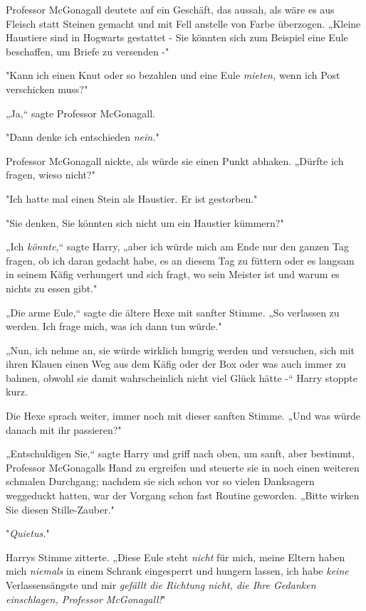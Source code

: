 {Professor McGonagall deutete auf ein Geschäft, das aussah, als wäre es aus Fleisch statt Steinen gemacht und mit Fell anstelle von Farbe überzogen. „Kleine Haustiere sind in Hogwarts gestattet - Sie könnten sich zum Beispiel eine Eule beschaffen, um Briefe zu versenden -"

"Kann ich einen Knut oder so bezahlen und eine Eule \emph{mieten,} wenn ich Post verschicken muss?"

„Ja,“ sagte Professor McGonagall.

"Dann denke ich entschieden \emph{nein.}"

Professor McGonagall nickte, als würde sie einen Punkt abhaken. „Dürfte ich fragen, wieso nicht?"

"Ich hatte mal einen Stein als Haustier. Er ist gestorben."

"Sie denken, Sie könnten sich nicht um ein Haustier kümmern?"

„Ich \emph{könnte,}“ sagte Harry, „aber ich würde mich am Ende nur den ganzen Tag fragen, ob ich daran gedacht habe, es an diesem Tag zu füttern oder es langsam in seinem Käfig verhungert und sich fragt, wo sein Meister ist und warum es nichts zu essen gibt."

„Die arme Eule,“ sagte die ältere Hexe mit sanfter Stimme. „So verlassen zu werden. Ich frage mich, was ich dann tun würde."

„Nun, ich nehme an, sie würde wirklich hungrig werden und versuchen, sich mit ihren Klauen einen Weg aus dem Käfig oder der Box oder was auch immer zu bahnen, obwohl sie damit wahrscheinlich nicht viel Glück hätte -“ Harry stoppte kurz.

Die Hexe sprach weiter, immer noch mit dieser sanften Stimme. „Und was würde danach mit ihr passieren?"

„Entschuldigen Sie,“ sagte Harry und griff nach oben, um sanft, aber bestimmt, Professor McGonagalls Hand zu ergreifen und steuerte sie in noch einen weiteren schmalen Durchgang; nachdem sie sich schon vor so vielen Danksagern weggeduckt hatten, war der Vorgang schon fast Routine geworden. „Bitte wirken Sie diesen Stille-Zauber."

"\emph{Quietus.}"

Harrys Stimme zitterte. „Diese Eule steht \emph{nicht} für mich, meine Eltern haben mich \emph{niemals} in einem Schrank eingesperrt und hungern lassen, ich habe \emph{keine} Verlassensängste und mir \emph{gefällt die Richtung nicht, die Ihre Gedanken einschlagen, Professor McGonagall!}"

}
